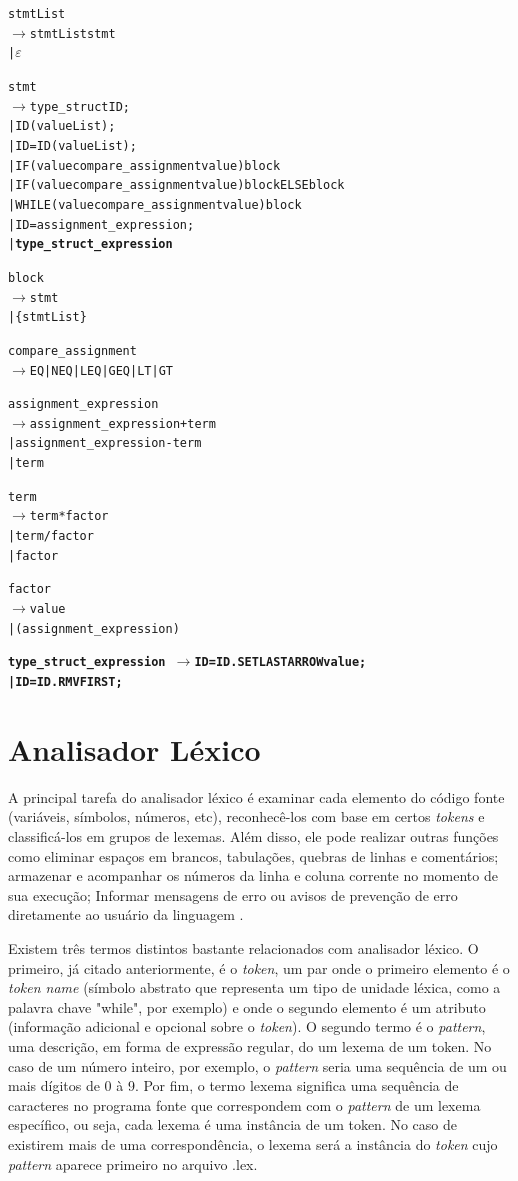 \documentclass[12pt]{article}
\begin{document}
\begin{alltt}{\footnotesize

stmtList
   \(\to\) stmtList stmt
   | \(\varepsilon\)

stmt
   \(\to\) type\_struct ID ;
    | ID ( valueList ) ;
    | ID = ID ( valueList ) ;
    | IF ( value compare\_assignment value ) block
    | IF ( value compare\_assignment value ) block ELSE block
    | WHILE ( value compare\_assignment value ) block
    | ID = assignment\_expression ;
    | \textbf{type_struct_expression}
    
block
	 \(\to\) stmt
    | \{ stmtList \}
    
compare\_assignment
   \(\to\) EQ | NEQ | LEQ | GEQ | LT | GT

assignment\_expression
   \(\to\) assignment\_expression + term
    | assignment\_expression - term
    | term
    
term
   \(\to\) term * factor
    | term / factor
    | factor
    
factor
   \(\to\) value
    | ( assignment\_expression )
    
\textbf{
type\_struct_expression\
   \(\to\) ID = ID . SETLAST ARROW value ;
    | ID = ID . RMVFIRST ;
}		
}\end{alltt}

\section{Analisador Léxico}

\indent A principal tarefa do analisador léxico é examinar cada elemento do código fonte (variáveis, símbolos, números, etc), reconhecê-los com base em certos \textit{tokens} e classificá-los em grupos de lexemas. Além disso, ele pode realizar outras funções como eliminar espaços em brancos, tabulações, quebras de linhas e comentários; armazenar e acompanhar os números da linha e  coluna corrente no momento de sua execução; Informar mensagens de erro ou avisos de prevenção de erro diretamente ao usuário da linguagem \cite{book}.

\indent Existem três termos distintos bastante relacionados com analisador léxico. O primeiro, já citado anteriormente, é o \textit{token}, um par onde o primeiro elemento é o \textit{token name} (símbolo abstrato que representa um tipo de unidade léxica, como a palavra chave "while", por exemplo) e onde o segundo elemento é um atributo (informação adicional e opcional sobre o \textit{token}). O segundo termo é o \textit{pattern}, uma descrição, em forma de expressão regular, do um lexema de um token. No caso de um número inteiro, por exemplo, o \textit{pattern} seria uma sequência de um ou mais dígitos de 0 à 9. Por fim, o termo lexema significa uma sequência de caracteres no programa fonte que correspondem com o \textit{pattern} de um lexema específico, ou seja, cada lexema é uma instância de um token. No caso de existirem mais de uma correspondência, o lexema será a instância do \textit{token} cujo \textit{pattern} aparece primeiro no arquivo .lex.
\end{document}
